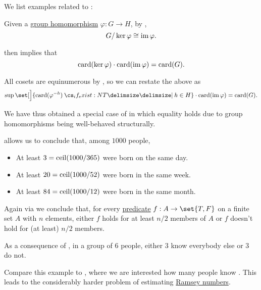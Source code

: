 \begin{example}\label{ex:thm:pigeonhole_principle}
  We list examples related to :
  \begin{thmenum}
     Given a \hyperref[def:group/homomorphism]{group homomorphism} \( \varphi: G \to H \), by ,
    \begin{equation*}
      G / \ker \varphi \cong \operatorname{im} \varphi.
    \end{equation*}

     then implies that
    \begin{equation*}
      \operatorname{card}(\ker \varphi) \cdot \operatorname{card}(\operatorname{im} \varphi) = \operatorname{card}(G).
    \end{equation*}

    All cosets are equinumerous by , so we can restate the above as
    \begin{equation*}
      \sup\set[\Big]{ \card(\varphi^{-h}) \given* h \in H } \cdot \card(\img \varphi) = \card(G).
    \end{equation*}

    We have thus obtained a special case of  in which equality holds due to group homomorphisms being well-behaved structurally.

      allows us to conclude that, among \( 1000 \) people,
    \begin{itemize}
      \item At least \( 3 = \operatorname{ceil}(1000 / 365) \) were born on the same day.
      \item At least \( 20 = \operatorname{ceil}(1000 / 52) \) were born in the same week.
      \item At least \( 84 = \operatorname{ceil}(1000 / 12) \) were born in the same month.
    \end{itemize}

     Again via  we conclude that, for every \hyperref[def:boolean_function]{predicate} \( f: A \to \set{ T, F } \) on a finite set \( A \) with \( n \) elements, either \( f \) holds for at least \( n / 2 \) members of \( A \) or \( f \) doesn't hold for (at least) \( n / 2 \) members.

     As a consequence of , in a group of \( 6 \) people, either \( 3 \) know everybody else or \( 3 \) do not.

    Compare this example to , where we are interested how many people know . This leads to the considerably harder problem of estimating \hyperref[def:ramsey_number]{Ramsey numbers}.
  \end{thmenum}
\end{example}

